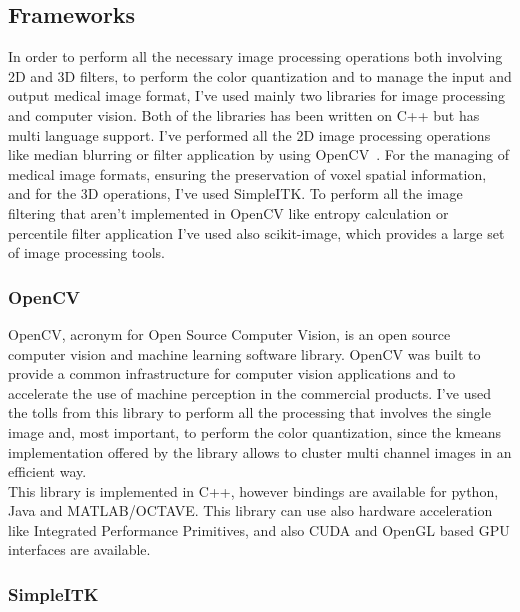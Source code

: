 \documentclass{standalone}
\begin{document}
	
	\subsection{Frameworks}
	
	In order to perform all the necessary image processing operations both involving 2D and 3D filters, to perform the color quantization and to manage the input and output medical image format, I've used mainly two libraries for image processing and computer vision. Both of the libraries has been written on C++ but has multi language support. I've performed all the 2D image processing operations like median blurring or filter application by using OpenCV~\cite{OpenCV}. For the managing of medical image formats, ensuring the preservation of voxel spatial information, and for the 3D operations, I've used SimpleITK. To perform all the image filtering that aren't implemented in OpenCV like entropy calculation or percentile filter application I've used also scikit-image, which provides a large set of image processing tools.
	
	\subsubsection*{OpenCV} 
	
	OpenCV, acronym for Open Source Computer Vision,  is an open source computer vision and machine learning software library. OpenCV was built to provide a common infrastructure for computer vision applications and to accelerate the use of machine perception in the commercial products.
	I've used the tolls from this library to perform all the processing that involves the single image and, most important, to perform the color quantization, since the kmeans implementation offered by the library allows to cluster multi channel images in an efficient way.\\	
	This library is implemented in C++, however bindings are available for python, Java and MATLAB/OCTAVE. This library can use also hardware acceleration like Integrated Performance Primitives, and also CUDA and OpenGL based GPU interfaces are available.\\
	
	\subsubsection*{SimpleITK} 
	
\end{document}
